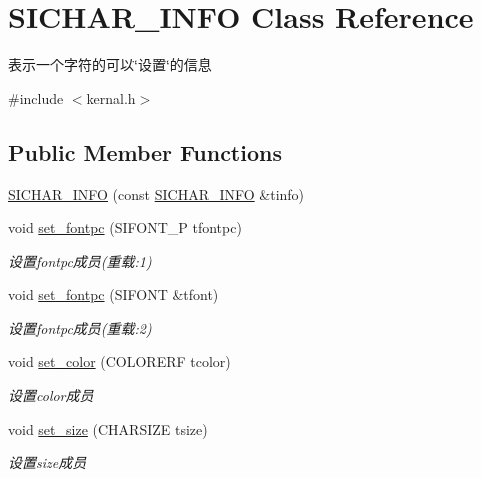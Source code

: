 \hypertarget{class_s_i_c_h_a_r___i_n_f_o}{}\section{S\+I\+C\+H\+A\+R\+\_\+\+I\+N\+FO Class Reference}
\label{class_s_i_c_h_a_r___i_n_f_o}


表示一个字符的可以\char`\"{}设置\char`\"{}的信息  




{\ttfamily \#include $<$kernal.\+h$>$}

\subsection*{Public Member Functions}
\begin{DoxyCompactItemize}
\item 
\hyperlink{class_s_i_c_h_a_r___i_n_f_o_a21b428740b8332500ae61f43b700d6b2}{S\+I\+C\+H\+A\+R\+\_\+\+I\+N\+FO} (const \hyperlink{class_s_i_c_h_a_r___i_n_f_o}{S\+I\+C\+H\+A\+R\+\_\+\+I\+N\+FO} \&tinfo)
\item 
void \hyperlink{class_s_i_c_h_a_r___i_n_f_o_a7dd5af8833b1951a6e4759668d484f37}{set\+\_\+fontpc} (S\+I\+F\+O\+N\+T\+\_\+P tfontpc)
\begin{DoxyCompactList}\small\item\em 设置fontpc成员(重载\+:1) \end{DoxyCompactList}\item 
void \hyperlink{class_s_i_c_h_a_r___i_n_f_o_a01ad1057400db3ccec680de26f4ab0a2}{set\+\_\+fontpc} (S\+I\+F\+O\+NT \&tfont)
\begin{DoxyCompactList}\small\item\em 设置fontpc成员(重载\+:2) \end{DoxyCompactList}\item 
void \hyperlink{class_s_i_c_h_a_r___i_n_f_o_a3c7718568eb9ff885af1bdfa8c197236}{set\+\_\+color} (C\+O\+L\+O\+R\+E\+RF tcolor)
\begin{DoxyCompactList}\small\item\em 设置color成员 \end{DoxyCompactList}\item 
void \hyperlink{class_s_i_c_h_a_r___i_n_f_o_afe883164593a8d3a5c9377eb5454c9f1}{set\+\_\+size} (C\+H\+A\+R\+S\+I\+ZE tsize)
\begin{DoxyCompactList}\small\item\em 设置size成员 \end{DoxyCompactList}\item 

\end{DoxyCompactItemize}
